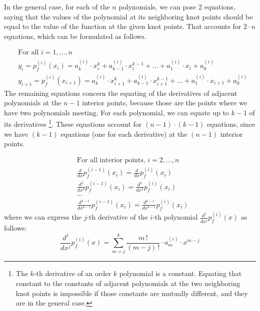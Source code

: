 \documentclass[12pt, a4paper]{article}
\begin{document}
In the general case, for each of the \( n\)  polynomials, we can pose 2 equations, saying that the values of the polynomial at its neighboring knot points should be equal to the value of the function at the given knot points. That accounts for \( 2 \cdot n\) equations, which can be formulated as follows.\par
\begin{equation}\label{eq:splineKnotValues}
\begin{aligned}
&\text{For all } i = 1, \ldots, n \\
&y_i = p_f^{(i)}(x_i) = a_k^{(i)} \cdot x_i^k + a_{k-1}^{(i)} \cdot x_i^{k-1} + \ldots + a_1^{(i)} \cdot x_i + a_0^{(i)} \\
&y_{i+1} = p_f^{(i)}(x_{i+1}) =a_k^{(i)} \cdot x_{i+1}^k + a_{k-1}^{(i)} \cdot x_{i+1}^{k-1} + \ldots + a_1^{(i)} \cdot x_{i+1} + a_0^{(i)}
\end{aligned}
\end{equation}
The remaining equations concern the equating of the derivatives of adjacent polynomials at the \( n-1 \) interior points, because those are the points where we have two polynomials meeting. For each polynomial, we can equate up to \( k-1\) of its derivatives \footnote{The \(k\)-th derivative of an order \(k\) polynomial is a constant. Equating that constant to the constants of adjacent polynomials at the two neighboring knot points is impossible if those constants are mutually different, and they are in the general case.}. These equations account for \( (n-1) \cdot (k-1)\) equations, since we have \( (k-1)\) equations (one for each derivative) at the \( (n-1) \) interior points.\par
\begin{equation} \label{eq:splineDerivativeEquations}
\begin{aligned}
    &\text{For all interior points, } i = 2,\dots, n \\
    &\frac{d}{dx}p_f^{(i-1)}(x_{i}) = \frac{d}{dx}p_f^{(i)}(x_{i}) \\
    &\frac{d^2}{dx^2}p_f^{(i-1)}(x_{i}) = \frac{d^2}{dx^2}p_f^{(i)}(x_{i})\\
    &\dots \\
    &\frac{d^{k-1}}{dx^{k-1}}p_f^{(i-1)}(x_{i}) = \frac{d^{k-1}}{dx^{k-1}}p_f^{(i)}(x_{i})
\end{aligned}
\end{equation}
where we can express the \( j\)-th derivative of the \(i\)-th polynomial \( \frac{d^j}{dx^j} p_f^{(i)}(x) \) as follows:
\begin{equation} \label{eq:polynomialDeriv}
    \frac{d^j}{dx^j} p_f^{(i)}(x) = \sum_{m = j}^{k} \frac{m\,!}{(m-j)\,!} \cdot a_m^{(i)} \cdot x^{m-j}
\end{equation}
\end{document}

